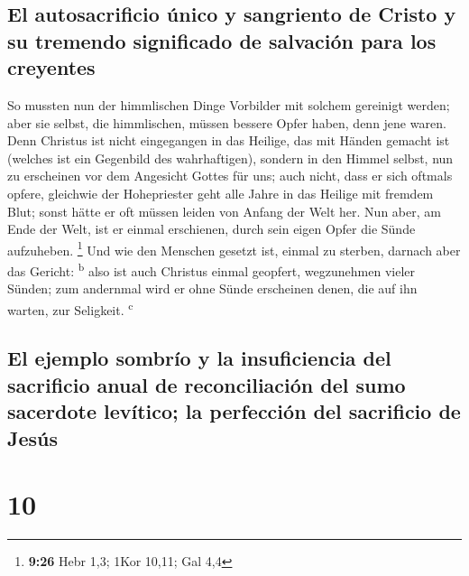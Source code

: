 \hypertarget{el-autosacrificio-uxfanico-y-sangriento-de-cristo-y-su-tremendo-significado-de-salvaciuxf3n-para-los-creyentes}{%
\subsection{El autosacrificio único y sangriento de Cristo y su tremendo
significado de salvación para los
creyentes}\label{el-autosacrificio-uxfanico-y-sangriento-de-cristo-y-su-tremendo-significado-de-salvaciuxf3n-para-los-creyentes}}

 So mussten nun der himmlischen Dinge Vorbilder mit
solchem gereinigt werden; aber sie selbst, die himmlischen, müssen
bessere Opfer haben, denn jene waren.  Denn Christus ist
nicht eingegangen in das Heilige, das mit Händen gemacht ist (welches
ist ein Gegenbild des wahrhaftigen), sondern in den Himmel selbst, nun
zu erscheinen vor dem Angesicht Gottes für uns;  auch
nicht, dass er sich oftmals opfere, gleichwie der Hohepriester geht alle
Jahre in das Heilige mit fremdem Blut;  sonst hätte er
oft müssen leiden von Anfang der Welt her. Nun aber, am Ende der Welt,
ist er einmal erschienen, durch sein eigen Opfer die Sünde aufzuheben.
\footnote{\textbf{9:26} Hebr 1,3; 1Kor 10,11; Gal 4,4} 
Und wie den Menschen gesetzt ist, einmal zu sterben, darnach aber das
Gericht: \textsuperscript{b}  also ist auch Christus
einmal geopfert, wegzunehmen vieler Sünden; zum andernmal wird er ohne
Sünde erscheinen denen, die auf ihn warten, zur Seligkeit.
\textsuperscript{c}

\hypertarget{el-ejemplo-sombruxedo-y-la-insuficiencia-del-sacrificio-anual-de-reconciliaciuxf3n-del-sumo-sacerdote-levuxedtico-la-perfecciuxf3n-del-sacrificio-de-jesuxfas}{%
\subsection{El ejemplo sombrío y la insuficiencia del sacrificio anual
de reconciliación del sumo sacerdote levítico; la perfección del
sacrificio de
Jesús}\label{el-ejemplo-sombruxedo-y-la-insuficiencia-del-sacrificio-anual-de-reconciliaciuxf3n-del-sumo-sacerdote-levuxedtico-la-perfecciuxf3n-del-sacrificio-de-jesuxfas}}

\hypertarget{section-9}{%
\section{10}\label{section-9}}


